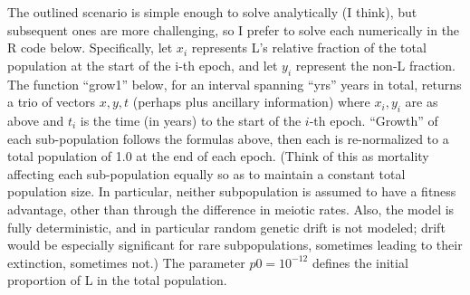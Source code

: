 \documentclass{article}\usepackage[]{graphicx}\usepackage[]{color}
\begin{document}
The outlined scenario is simple enough to solve analytically (I think), but subsequent ones are more
challenging, so I prefer to solve each numerically in the R code below.  Specifically, let $x_i$
represents L's relative fraction of the total population at the start of the i-th epoch, and let
$y_i$ represent the non-L fraction.  The function ``grow1'' below, for an interval spanning ``yrs''
years in total, returns a trio of vectors $x,y,t$ (perhaps plus ancillary information) where
$x_i,y_i$ are as above and $t_i$ is the time (in years) to the start of the $i$-th epoch.
``Growth'' of each sub-population follows the formulas above, then each is re-normalized to a total
population of 1.0 at the end of each epoch.  (Think of this as mortality affecting each
sub-population equally so as to maintain a constant total population size.  In particular, neither
subpopulation is assumed to have a fitness advantage, other than through the difference in meiotic
rates.  Also, the model is fully deterministic, and in particular random genetic drift is not
modeled; drift would be especially significant for rare subpopulations, sometimes leading to their
extinction, sometimes not.) The parameter $p0=10^{-12}$ defines the initial proportion of L in the
total population.
\end{document}
